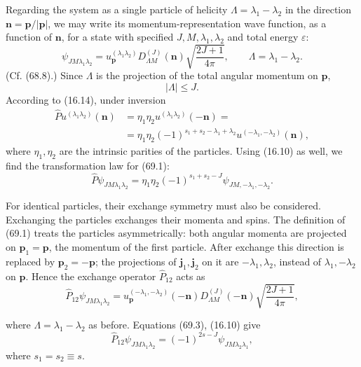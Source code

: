 Regarding the system as a single particle of helicity $\Lambda=\lambda_1-\lambda_2$ in the direction $\mathbf n=\mathbf p/|\mathbf p|$, we may write its momentum-representation wave function, as a function of $\mathbf n$, for a state with specified $J,M,\lambda_1,\lambda_2$ and total energy $\varepsilon$:
\begin{equation}
\psi_{JM\lambda_1\lambda_2}
=u_{\mathbf p}^{(\lambda_1\lambda_2)}D_{\Lambda M}^{(J)}(\mathbf n)
\sqrt{\frac{2J+1}{4\pi}},
\qquad \Lambda=\lambda_1-\lambda_2.
\tag{69.1}
\end{equation}
(Cf. (68.8).) Since $\Lambda$ is the projection of the total angular momentum on $\mathbf p$,
\begin{equation}
|\Lambda|\leqslant J.
\tag{69.2}
\end{equation}
According to (16.14), under inversion
\begin{equation}
\begin{aligned}
\widehat P u^{(\lambda_1\lambda_2)}(\mathbf n)
&=\eta_1\eta_2u^{(\lambda_1\lambda_2)}(-\mathbf n)={}\\
&=\eta_1\eta_2(-1)^{s_1+s_2-\lambda_1+\lambda_2}
u^{(-\lambda_1,-\lambda_2)}(\mathbf n),
\end{aligned}
\tag{69.3}
\end{equation}
where $\eta_1,\eta_2$ are the intrinsic parities of the particles. Using (16.10) as well, we find the transformation law for (69.1):
\begin{equation}
\widehat P\psi_{JM\lambda_1\lambda_2}
=\eta_1\eta_2(-1)^{s_1+s_2-J}\psi_{JM,-\lambda_1,-\lambda_2}.
\tag{69.4}
\end{equation}

For identical particles, their exchange symmetry must also be considered. Exchanging the particles exchanges their momenta and spins. The definition of (69.1) treats the particles asymmetrically: both angular momenta are projected on $\mathbf p_1=\mathbf p$, the momentum of the first particle. After exchange this direction is replaced by $\mathbf p_2=-\mathbf p$; the projections of $\mathbf j_1,\mathbf j_2$ on it are $-\lambda_1,\lambda_2$, instead of $\lambda_1,-\lambda_2$ on $\mathbf p$. Hence the exchange operator $\widehat P_{12}$ acts as
\[
\widehat P_{12}\psi_{JM\lambda_1\lambda_2}
=u_{\mathbf p}^{(-\lambda_1,-\lambda_2)}(-\mathbf n)
D_{\Lambda M}^{(J)}(-\mathbf n)\sqrt{\frac{2J+1}{4\pi}},
\]

where $\Lambda=\lambda_1-\lambda_2$ as before. Equations (69.3), (16.10) give
\begin{equation}
\widehat P_{12}\psi_{JM\lambda_1\lambda_2}
=(-1)^{2s-J}\psi_{JM\lambda_2\lambda_1},
\tag{69.5}
\end{equation}
where $s_1=s_2\equiv s$.

